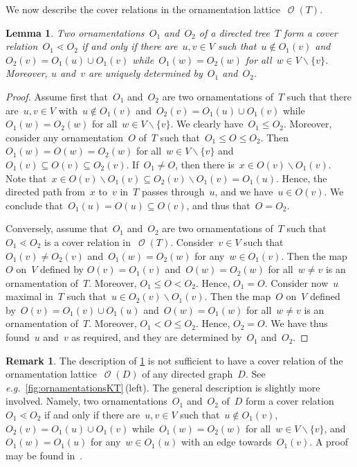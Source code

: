 \documentclass{amsart}
\newtheorem{lemma}[theorem]{Lemma}
\theoremstyle{definition}
\newtheorem{remark}[theorem]{Remark}
\renewcommand{\c}[1]{\mathcal{#1}} %
\newcommand{\ssm}{\smallsetminus} %
\newcommand{\eg}{\textit{e.g.}~} %
\DeclareMathOperator{\Orn}{\c{O}}  %
\begin{document}
We now describe the cover relations in the ornamentation lattice~$\Orn(T)$.

\begin{lemma}
\label{lem:coverRelationsOrnT}
Two ornamentations~$O_1$ and~$O_2$ of a directed tree~$T$ form a cover relation~$O_1 \lessdot O_2$ if and only if there are~$u, v \in V$ such that~$u \notin O_1(v)$ and $O_2(v) = O_1(u) \cup O_1(v)$ while~$O_1(w) = O_2(w)$ for all~${w \in V \ssm \{v\}}$.
Moreover, $u$ and~$v$ are uniquely determined by~$O_1$ and~$O_2$.
\end{lemma}

\begin{proof}
Assume first that~$O_1$ and~$O_2$ are two ornamentations of~$T$ such that there are~$u, v \in V$ with~$u \notin O_1(v)$ and~$O_2(v) = O_1(u) \cup O_1(v)$ while~$O_1(w) = O_2(w)$ for all~${w \in V \ssm \{v\}}$.
We clearly have~$O_1 \le O_2$.
Moreover, consider any ornamentation~$O$ of~$T$ such that~$O_1 \le O \le O_2$.
Then~$O_1(w) = O(w) = O_2(w)$ for all~${w \in V \ssm \{v\}}$ and~$O_1(v) \subseteq O(v) \subseteq O_2(v)$.
If~$O_1 \ne O$, then there is~$x \in O(v) \ssm O_1(v)$.
Note that~$x \in O(v) \ssm O_1(v) \subseteq O_2(v) \ssm  O_1(v) = O_1(u)$.
Hence, the directed path from~$x$ to~$v$ in~$T$ passes through~$u$, and we have~$u \in O(v)$.
We conclude that~$O_1(u) = O(u) \subseteq O(v)$, and thus that~$O = O_2$.

Conversely, assume that~$O_1$ and~$O_2$ are two ornamentations of~$T$ such that~$O_1 \lessdot O_2$ is a cover relation in~$\Orn(T)$.
Consider~$v \in V$ such that~$O_1(v) \ne O_2(v)$ and~$O_1(w) = O_2(w)$ for any~$w \in O_1(v)$.
Then the map~$O$ on~$V$ defined by $O(v) = O_1(v)$ and~$O(w) = O_2(w)$ for all~$w \ne v$ is an ornamentation of~$T$. %
Moreover, $O_1 \le O < O_2$.
Hence, $O_1 = O$.
Consider now~$u$ maximal in~$T$ such that~$u \in O_2(v) \ssm O_1(v)$.
Then the map~$O$ on~$V$ defined by~$O(v) = O_1(v) \cup O_1(u)$ and~$O(w) = O_1(w)$ for all~$w \ne v$ is an ornamentation of~$T$.
Moreover, $O_1 < O \le O_2$.
Hence, $O_2 = O$.
We have thus found~$u$ and~$v$ as required, and they are determined by~$O_1$ and~$O_2$.
\end{proof}

\begin{remark}
\label{rem:coverRelationsOrn}
The description of \cref{lem:coverRelationsOrnT} is not sufficient to have a cover relation of the ornamentation lattice~$\Orn(D)$ of any directed graph~$D$.
See \eg \cref{fig:ornamentationsKT}\,(left).
The general description is slightly more involved.
Namely, two ornamentations~$O_1$ and~$O_2$ of~$D$ form a cover relation~$O_1 \lessdot O_2$ if and only if there are~$u, v \in V$ such that~$u \notin O_1(v)$, $O_2(v) = O_1(u) \cup O_1(v)$ while~$O_1(w) = O_2(w)$ for all~${w \in V \ssm \{v\}}$, and~$O_1(w) = O_1(u)$ for any~$w \in O_1(u)$ with an edge towards~$O_1(v)$. A proof may be found in~\cite{Sack}.
\end{remark}
\end{document}
